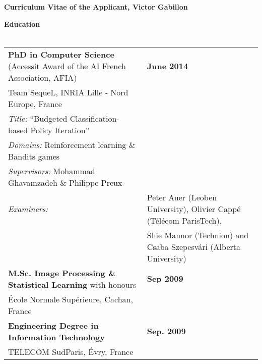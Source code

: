  \begin{center} \textbf{Curriculum Vitae of the Applicant,  Victor Gabillon}  \end{center}
 
\noindent\textbf{Education}\\[-.4cm]\noindent\makebox[\linewidth]{\rule{\columnwidth}{0.4pt}}\\[.1cm]
\noindent\begin{tabularx}{\columnwidth}{@{} l X @{}}
\noindent\textbf{PhD in Computer Science} (Accessit Award of the AI French Association, AFIA)& \hfill \textbf{June 2014} \\
Team SequeL, INRIA Lille - Nord Europe, France\\
\textit{Title:} ``Budgeted Classification-based Policy Iteration''\\
\textit{Domains:} Reinforcement learning \& Bandits games\\
\textit{Supervisors:}  Mohammad Ghavamzadeh \&  Philippe Preux\\
\noindent\textit{Examiners:}\begin{tabular}{ll}  &Peter Auer (Leoben University), Olivier Cappé   (Télécom ParisTech), \\
\noindent & Shie Mannor   (Technion)  and Csaba Szepesvári  (Alberta  University)  
\end{tabular}\\[.2cm]
\textbf{M.Sc. Image Processing \& Statistical Learning} with honours &\hfill \textbf{ Sep 2009}\\
 École Normale Supérieure, Cachan, France\\[.2cm]
\textbf{Engineering Degree in Information Technology}  &\hfill \textbf{ Sep. 2009}\\
 TELECOM SudParis, Évry, France
\end{tabularx}\\[.2cm]

